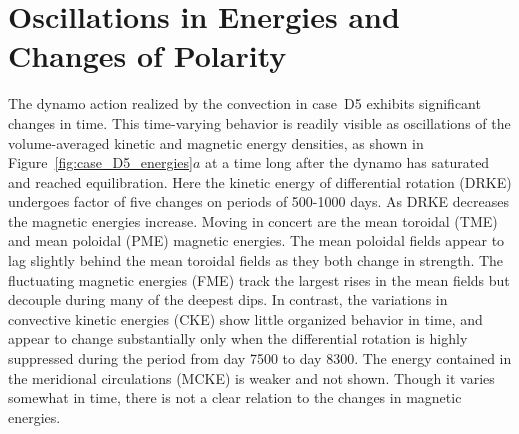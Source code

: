 \section{Oscillations in Energies and Changes of Polarity}
The dynamo action realized by the convection in case~D5 exhibits
significant changes in time.  This time-varying behavior is readily
visible as oscillations of the volume-averaged kinetic and magnetic
energy densities, as shown in Figure~\ref{fig:case_D5_energies}$a$ at
a time long after the dynamo has saturated and reached equilibration.
Here the kinetic energy of differential rotation (DRKE) undergoes
factor of five changes on periods of 500-1000 days.  As DRKE decreases
the magnetic energies increase. Moving in concert are the mean
toroidal (TME) and mean poloidal (PME) magnetic energies.  The mean
poloidal fields appear to lag slightly behind the mean toroidal fields
as they both change in strength. The fluctuating magnetic energies
(FME) track the largest rises in the mean fields but decouple during
many of the deepest dips.  In contrast, the variations in convective
kinetic energies (CKE) show little organized behavior in time, and
appear to change substantially only when the differential rotation is
highly suppressed during the period from day 7500 to day 8300.  The
energy contained in the meridional circulations (MCKE) is weaker and
not shown.  Though it varies somewhat in time, there is not a clear
relation to the changes in magnetic energies.

